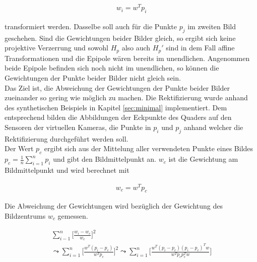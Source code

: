 \begin{gather}
	w_i=w^Tp_i
\end{gather} 

transformiert werden. Dasselbe soll auch für die Punkte $p_j$ im zweiten Bild geschehen. Sind die Gewichtungen beider Bilder gleich, so ergibt sich keine projektive Verzerrung und sowohl $H_p$ also auch $H_p'$ sind in dem Fall affine Transformationen und die Epipole wären bereits im unendlichen. Angenommen beide Epipole befinden sich noch nicht im unendlichen, so können die Gewichtungen der Punkte beider Bilder nicht gleich sein\cite{ZZ}.\\

Das Ziel ist, die Abweichung der Gewichtungen der Punkte beider Bilder zueinander so gering wie möglich zu machen. Die Rektifizierung wurde anhand des synthetischen Beispiels in Kapitel \ref{sec:minimal} implementiert. Dem entsprechend bilden die Abbildungen der Eckpunkte des Quaders auf den Sensoren der virtuellen Kameras, die Punkte in $p_i$ und $p_j$ anhand welcher die Rektifizierung durchgeführt werden soll. \\

%
 
Der Wert $p_c$ ergibt sich aus der Mittelung aller verwendeten Punkte eines Bildes $p_c = \frac{1}{n} \sum_{i=1}^{n} p_i$ und gibt den Bildmittelpunkt an. $w_c$ ist die Gewichtung am Bildmittelpunkt und wird berechnet mit

\begin{gather}
	w_c = w^Tp_c
\end{gather}


Die Abweichung der Gewichtungen wird bezüglich der Gewichtung des Bildzentrums $w_c$ gemessen. 

\begin{gather}
	\sum_{i-1}^{n}\Big[\frac{w_i-w_c}{w_c} \Big]^2\\
	\leadsto \sum_{i=1}^{n}\Big[\frac{w^T (p_i-p_c)}{w^Tp_c} \Big]^2
	\leadsto \sum_{i=1}^{n}\Big[\frac{w^T (p_i-p_c)(p_i-p_c)^Tw}{w^Tp_cp_c^Tw} \Big]
\end{gather}\\

